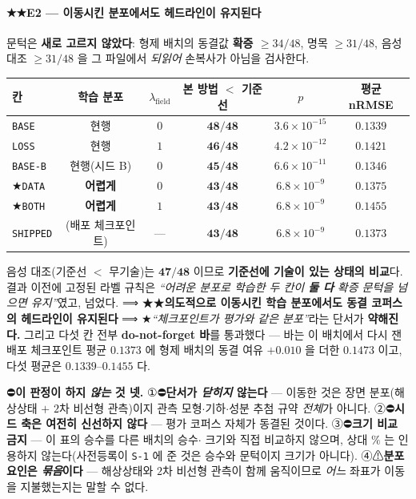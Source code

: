 \documentclass[11pt]{report}
\numberwithin{equation}{chapter}
\numberwithin{figure}{chapter}
\numberwithin{table}{chapter}
\begin{document}
\paragraph{★★E2 --- 이동시킨 분포에서도 헤드라인이 유지된다}
문턱은 \textbf{새로 고르지 않았다}: 형제 배치의 동결값 \textbf{확증 $\ge 34/48$},
명목 $\ge 31/48$, 음성 대조 $\ge 31/48$ 을 그 파일에서 \emph{되읽어} 손복사가 아님을
검사한다.

\begin{center}
\small
\begin{tabular}{lccccc}
\toprule
칸 & 학습 분포 & $\lambda_{\mathrm{field}}$ & 본 방법 $<$ 기준선 & $p$ & 평균 nRMSE \\
\midrule
\texttt{BASE}    & 현행 & $0$ & $\mathbf{48/48}$ & $3.6\times10^{-15}$ & $0.1339$ \\
\texttt{LOSS}    & 현행 & $1$ & $\mathbf{46/48}$ & $4.2\times10^{-12}$ & $0.1421$ \\
\texttt{BASE-B}  & 현행(시드 B) & $0$ & $\mathbf{45/48}$ & $6.6\times10^{-11}$ & $0.1346$ \\
★\texttt{DATA}  & \textbf{어렵게} & $0$ & $\mathbf{43/48}$ & $6.8\times10^{-9}$ & $0.1375$ \\
★\texttt{BOTH}  & \textbf{어렵게} & $1$ & $\mathbf{43/48}$ & $6.8\times10^{-9}$ & $0.1455$ \\
\texttt{SHIPPED} & (배포 체크포인트) & --- & $\mathbf{43/48}$ & $6.8\times10^{-9}$ & $0.1373$ \\
\bottomrule
\end{tabular}
\end{center}
\noindent
음성 대조(기준선 $<$ 무기술)는 $\mathbf{47/48}$ 이므로 \textbf{기준선에 기술이 있는 상태의
비교}다. 결과 이전에 고정된 라벨 규칙은 \emph{``어려운 분포로 학습한 두 칸이 \textbf{둘 다}
확증 문턱을 넘으면 유지''}였고, 넘었다.
⟹ ★★\textbf{의도적으로 이동시킨 학습 분포에서도 동결 코퍼스의 헤드라인이 유지된다}
⟹ ★\emph{``체크포인트가 평가와 같은 분포''}라는 단서가 \textbf{약해진다.}
그리고 다섯 칸 전부 \textbf{do-not-forget 바}를 통과했다 --- 바는 이 배치에서 다시 잰 배포
체크포인트 평균 $\mathbf{0.1373}$ 에 형제 배치의 동결 여유 $+0.010$ 을 더한
$\mathbf{0.1473}$ 이고, 다섯 평균은 $0.1339$--$0.1455$ 다.

⛔\textbf{이 판정이 하지 \emph{않는} 것 넷.} ①⛔\textbf{단서가 \emph{닫히지} 않는다} ---
이동한 것은 장면 분포(해상상태 $+$ $2$차 비선형 관측)이지 관측 모형$\cdot$기하$\cdot$성분
추첨 규약 \emph{전체}가 아니다. ②⛔\textbf{시드 축은 여전히 신선하지 않다} --- 평가 코퍼스
자체가 동결된 것이다. ③⛔\textbf{크기 비교 금지} --- 이 표의 승수를 다른 배치의 승수$\cdot$
크기와 직접 비교하지 않으며, 상대 $\%$ 는 인용하지 않는다(사전등록이 \texttt{S-1} 에 준 것은
승수와 문턱이지 크기가 아니다). ④⚠\textbf{분포 요인은 \emph{묶음}이다} --- 해상상태와 $2$차
비선형 관측이 함께 움직이므로 \emph{어느} 좌표가 이동을 지불했는지는 말할 수 없다.
\end{document}
